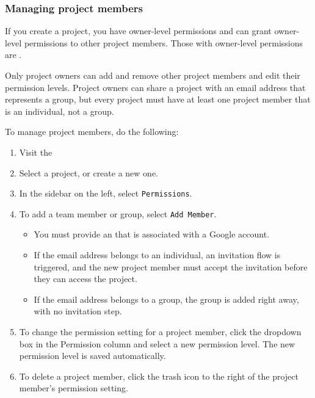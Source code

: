 \subsubsection{Managing project members}

If you create a project, you have owner-level permissions and can grant
owner-level permissions to other project members. Those with owner-level
permissions are .

Only project owners can add and remove other project members and edit
their permission levels. Project owners can share a project with an
email address that represents a group, but every project must have at
least one project member that is an individual, not a group.

To manage project members, do the following:

\begin{enumerate}
\item
Visit the 
\item
Select a project, or create a new one.
\item
In the sidebar on the left, select \verb|Permissions|.
\item
To add a team member or group, select \verb|Add Member|. 
\begin{itemize}
\item
You must provide an
 that is associated with a Google account. 
\item
If the email
address belongs to an individual, an invitation flow is triggered,
and the new project member must accept the invitation before they can
access the project. 
\item
If the email address belongs to a group, the group
is added right away, with no invitation step.
\end{itemize}
\item
To change the permission setting for a project member, click the dropdown
box in the Permission column and select a new permission level. The new
permission level is saved automatically.
\item
To delete a project member, click the trash icon to the right of the
project member's permission setting.
\end{enumerate}

